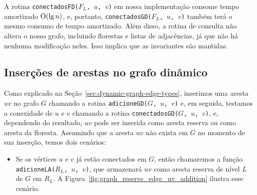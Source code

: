 \raggedbottom


A rotina \texttt{conectadosFD($F_L$, $u$, $v$)} em nossa implementação consome tempo amortizado $\mathrm{O}(\lg n)$, e, portanto, \texttt{conectadosGD($F_L$, $u$, $v$)} também terá o mesmo consumo de tempo amortizado.
Além disso, a rotina de consulta não altera o nosso grafo, incluindo florestas e listas de adjacências, já que não há nenhuma modificação neles. Isso implica que as invariantes são mantidas. 









\subsection{Inserções de arestas no grafo dinâmico}

Como explicado na Seção~\ref{sec:dynamic-graph-edge-types}, inserimos uma aresta $uv$ no grafo $G$ chamando a rotina \texttt{adicioneGD($G$, $u$, $v$)} e, em seguida, testamos a conexidade de $u$ e $v$ chamando a rotina \texttt{conectadosGD($G$, $u$, $v$)}, e, dependendo do resultado, $uv$ pode ser inserida como aresta reserva ou como aresta da floresta. Assumindo que a aresta $uv$ não exista em $G$ no momento de sua inserção, temos dois cenários:

\begin{itemize}
    \item 
    Se os vértices $u$ e $v$ já estão conectados em $G$, então chamaremos a função \texttt{adicioneLA($R_L$, $u$, $v$)}, que armazenará $uv$ como aresta reserva de nível $L$ de $G$ em $R_L$. A Figura~\ref{fig:graph_reserve_edge_uv_addition} ilustra esse cenário.

\end{itemize}

